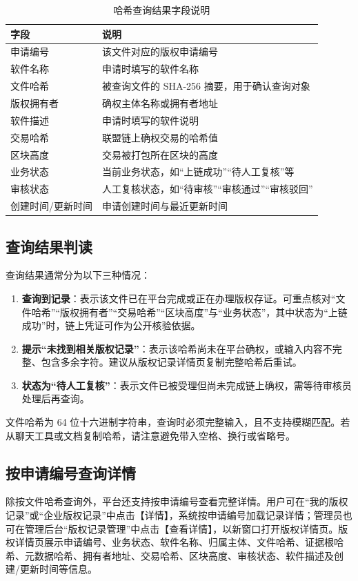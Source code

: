 \documentclass[UTF8,a4paper,12pt]{ctexart}
\newcommand{\notice}[1]{%
  \par\vspace{0.6em}\noindent
  {\setlength{\fboxsep}{6pt}%
   \colorbox{gray!8}{\parbox{\dimexpr\linewidth-12pt\relax}{%
     \setlength{\parindent}{2em}\small #1}}}%
  \par\vspace{0.6em}%
}
\begin{document}
\begin{table}[H]
  \centering
  \caption{哈希查询结果字段说明}
  \label{tab:hash-query-field}
  \begin{tabularx}{0.96\textwidth}{p{} Y}
    \toprule
    字段 & 说明 \\
    \midrule
    申请编号 & 该文件对应的版权申请编号 \\
    软件名称 & 申请时填写的软件名称 \\
    文件哈希 & 被查询文件的 SHA-256 摘要，用于确认查询对象 \\
    版权拥有者 & 确权主体名称或拥有者地址 \\
    软件描述 & 申请时填写的软件说明 \\
    交易哈希 & 联盟链上确权交易的哈希值 \\
    区块高度 & 交易被打包所在区块的高度 \\
    业务状态 & 当前业务状态，如“上链成功”“待人工复核”等 \\
    审核状态 & 人工复核状态，如“待审核”“审核通过”“审核驳回” \\
    创建时间/更新时间 & 申请创建时间与最近更新时间 \\
    \bottomrule
  \end{tabularx}
\end{table}

\subsection{查询结果判读}
\indent 查询结果通常分为以下三种情况：\par

\begin{enumerate}
  \item \textbf{查询到记录}：表示该文件已在平台完成或正在办理版权存证。可重点核对“文件哈希”“版权拥有者”“交易哈希”“区块高度”与“业务状态”，其中状态为“上链成功”时，链上凭证可作为公开核验依据。
  \item \textbf{提示“未找到相关版权记录”}：表示该哈希尚未在平台确权，或输入内容不完整、包含多余字符。建议从版权记录详情页复制完整哈希后重试。
  \item \textbf{状态为“待人工复核”}：表示文件已被受理但尚未完成链上确权，需等待审核员处理后再查询。
\end{enumerate}

\notice{文件哈希为 64 位十六进制字符串，查询时必须完整输入，且不支持模糊匹配。若从聊天工具或文档复制哈希，请注意避免带入空格、换行或省略号。}

\subsection{按申请编号查询详情}
\indent 除按文件哈希查询外，平台还支持按申请编号查看完整详情。用户可在“我的版权记录”或“企业版权记录”中点击【详情】，系统按申请编号加载记录详情；管理员也可在管理后台“版权记录管理”中点击【查看详情】，以新窗口打开版权详情页。版权详情页展示申请编号、业务状态、软件名称、归属主体、文件哈希、证据根哈希、元数据哈希、拥有者地址、交易哈希、区块高度、审核状态、软件描述及创建/更新时间等信息。\par
\end{document}
